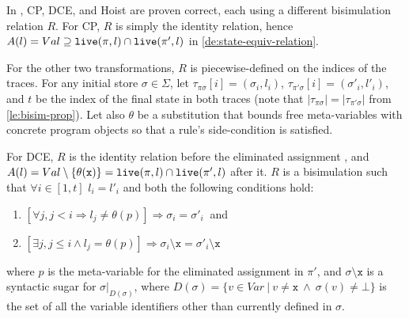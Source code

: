 \begin{myproof}
In \cite{Lacey02}, CP, DCE, and Hoist are proven correct, each using a different bisimulation relation $R$. 
For CP, $R$ is simply the identity relation, hence $A(l)=Val\supseteq \text{${\tt live}$}(\pi,l)\cap \text{${\tt live}$}(\pi',l)$ in \mydefinition\ref{de:state-equiv-relation}.

For the other two transformations, $R$ is piecewise-defined on the indices of the traces. For any initial store $\sigma\in \Sigma$, let $\tau_{\pi\sigma}[i]=(\sigma_i,l_i)$, $\tau_{\pi'\sigma}[i]=(\sigma'_i,l'_i)$, and $t$ be the index of the final state in both traces (note that $|\tau_{\pi\sigma}|=|\tau_{\pi'\sigma}|$ from \ref{le:bisim-prop}). Let also $\theta$ be a substitution that bounds free meta-variables with concrete program objects so that a rule's side-condition is satisfied.

For DCE, $R$ is the identity relation before the eliminated assignment , and $A(l)=Val\setminus\{\theta(\text{${\tt x}$})\}=\text{${\tt live}$}(\pi,l)\cap \text{${\tt live}$}(\pi',l)$ after it. $R$ is a bisimulation such that $\forall i\in[1,t]$ $l_i=l'_i$ and both the following conditions hold:
\begin{enumerate}
 \item $[\forall j, j<i \Rightarrow l_j\neq \theta(p)] \Rightarrow \sigma_i=\sigma'_i~$ and
 \item $[\exists j, j\leq i \wedge l_j = \theta(p)] \Rightarrow \sigma_i\setminus\texttt{x}=\sigma'_i\setminus\texttt{x}$
\end{enumerate}
\noindent where $p$ is the meta-variable for the eliminated assignment in $\pi'$, and $\sigma\setminus\texttt{x}$ is a syntactic sugar for $\sigma\vert_{D(\sigma)}$, where $D(\sigma)=\{v\in Var ~|~ v\neq \texttt{x} ~\wedge~ \sigma(v)\neq\bot\}$ is the set of all the variable identifiers other than  currently defined in $\sigma$.


\end{myproof}
